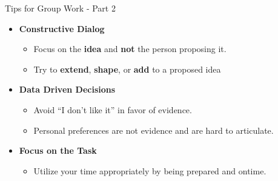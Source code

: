 \begin{frame}{Tips for Group Work - Part 2}

\begin{itemize}
\tightlist
\item
  \textbf{Constructive Dialog}

  \begin{itemize}
  \tightlist
  \item
    Focus on the \textbf{idea} and \textbf{not} the person proposing it.
  \item
    Try to \textbf{extend}, \textbf{shape}, or \textbf{add} to a
    proposed idea
  \end{itemize}
\item
  \textbf{Data Driven Decisions}

  \begin{itemize}
  \tightlist
  \item
    Avoid ``I don't like it'' in favor of evidence.
  \item
    Personal preferences are not evidence and are hard to articulate.
  \end{itemize}
\item
  \textbf{Focus on the Task}

  \begin{itemize}
  \tightlist
  \item
    Utilize your time appropriately by being prepared and ontime.
  \end{itemize}
\end{itemize}

\end{frame}

